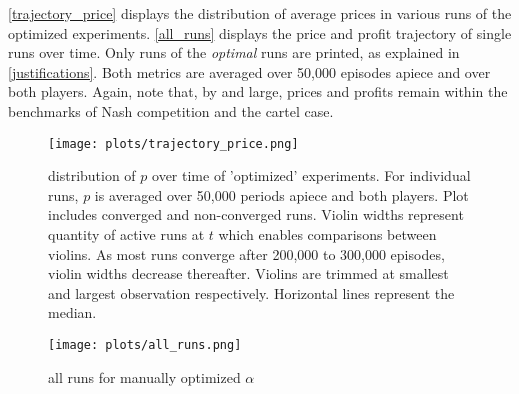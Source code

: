\autoref{trajectory_price} displays the distribution of average prices in various runs of the optimized experiments. \autoref{all_runs} displays the price and profit trajectory of single runs over time. Only runs of the \emph{optimal} runs are printed, as explained in \autoref{justifications}. Both metrics are averaged over 50,000 episodes apiece and over both players. Again, note that, by and large, prices and profits remain within the benchmarks of Nash competition and the cartel case.


\begin{figure}
	\texttt{[image: plots/trajectory\_price.png]}
	\caption{distribution of $p$ over time of 'optimized' experiments. For individual runs, $p$ is averaged over 50,000 periods apiece and both players. Plot includes converged and non-converged runs. Violin widths represent quantity of active runs at $t$ which enables comparisons between violins. As most runs converge after 200,000 to 300,000 episodes, violin widths decrease thereafter. Violins are trimmed at smallest and largest observation respectively. Horizontal lines represent the median.}
	\label{trajectory_price}
\end{figure}

\begin{figure}
	\texttt{[image: plots/all\_runs.png]}
	\caption{all runs for manually optimized $\alpha$}
	\label{all_runs}
\end{figure}
